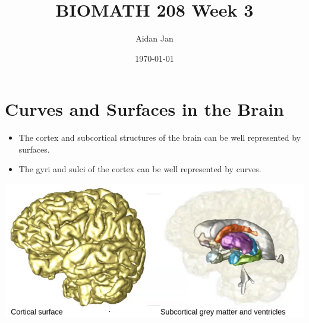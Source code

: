 \documentclass[10pt]{article}
\title{BIOMATH 208 Week 3}
\author{Aidan Jan}
\date{\today}
\begin{document}
\maketitle
\section*{Curves and Surfaces in the Brain}
\begin{itemize}
    \item The cortex and subcortical structures of the brain can be well represented by surfaces.
    \item The gyri and sulci of the cortex can be well represented by curves.
\end{itemize}
\begin{center}
    \includegraphics*[width=\textwidth]{W3_1.png}
\end{center}
\end{document}
